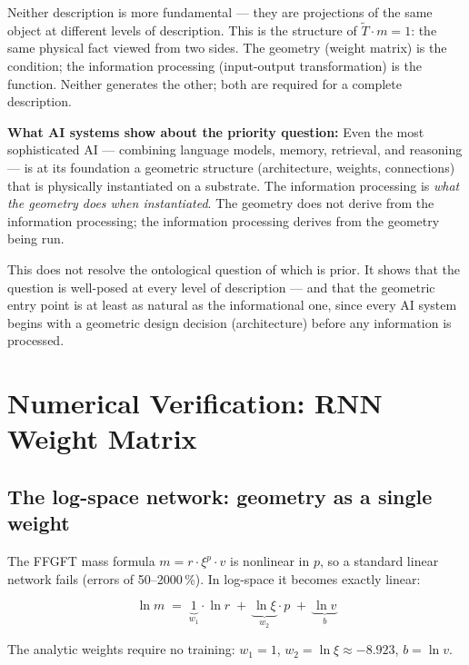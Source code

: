 Neither description is more fundamental --- they are projections of
the same object at different levels of description. This is the
structure of $\tilde{T} \cdot m = 1$: the same physical fact viewed
from two sides. The geometry (weight matrix) is the condition; the
information processing (input-output transformation) is the function.
Neither generates the other; both are required for a complete
description.

\textbf{What AI systems show about the priority question:} Even the
most sophisticated AI --- combining language models, memory, retrieval,
and reasoning --- is at its foundation a geometric structure
(architecture, weights, connections) that is physically instantiated
on a substrate. The information processing is \emph{what the geometry
does when instantiated}. The geometry does not derive from the
information processing; the information processing derives from the
geometry being run.

This does not resolve the ontological question of which is prior. It
shows that the question is well-posed at every level of description ---
and that the geometric entry point is at least as natural as the
informational one, since every AI system begins with a geometric
design decision (architecture) before any information is processed.


\section{Numerical Verification: RNN Weight Matrix}

\subsection{The log-space network: geometry as a single weight}

The FFGFT mass formula $m = r \cdot \xi^p \cdot v$ is nonlinear in $p$,
so a standard linear network fails (errors of 50--2000\,\%). In
log-space it becomes exactly linear:

\begin{equation}
  \ln m \;=\; \underbrace{1}_{w_1}\cdot\ln r
           \;+\; \underbrace{\ln\xi}_{w_2}\cdot p
           \;+\; \underbrace{\ln v}_{b}
  \tag{243.11}
\end{equation}

The analytic weights require no training:
$w_1 = 1$, $w_2 = \ln\xi \approx -8.923$, $b = \ln v$.

